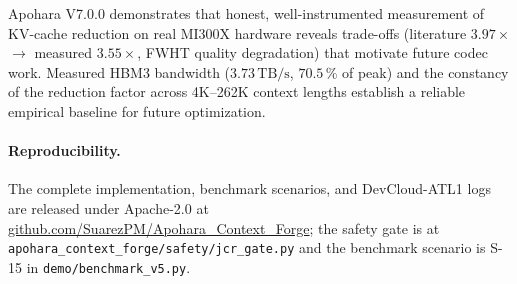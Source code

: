 \documentclass[10pt,twocolumn]{article}
\newcommand{\code}[1]{\texttt{\small #1}}
\begin{document}
Apohara V7.0.0 demonstrates that honest, well-instrumented measurement of
KV-cache reduction on real MI300X hardware reveals trade-offs (literature
$3.97\times$ $\to$ measured $3.55\times$, FWHT quality degradation) that
motivate future codec work. Measured HBM3 bandwidth ($3.73\,\mathrm{TB/s}$,
$70.5\,\%$ of peak) and the constancy of the reduction factor across
4K--262K context lengths establish a reliable empirical baseline for
future optimization.

\paragraph{Reproducibility.}
The complete implementation, benchmark scenarios, and DevCloud-ATL1 logs
are released under Apache-2.0 at
\href{https://github.com/SuarezPM/Apohara_Context_Forge}%
     {github.com/SuarezPM/Apohara\_Context\_Forge}; the safety gate is at
\code{apohara\_context\_forge/safety/jcr\_gate.py} and the benchmark
scenario is S-15 in \code{demo/benchmark\_v5.py}.



\end{document}
